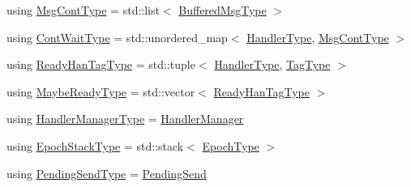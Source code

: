 \begin{DoxyCompactItemize}
using \hyperlink{structvt_1_1messaging_1_1_active_messenger_a18bbfbf9ecd82b33f6fc475b2e5290a5}{Msg\+Cont\+Type} = std\+::list$<$ \hyperlink{structvt_1_1messaging_1_1_active_messenger_a80a9cbda399d7bf035bfcecc761f4b02}{Buffered\+Msg\+Type} $>$
\item 
using \hyperlink{structvt_1_1messaging_1_1_active_messenger_a1c52f4ec0c93821191cb3e69dc7c8604}{Cont\+Wait\+Type} = std\+::unordered\+\_\+map$<$ \hyperlink{namespacevt_af64846b57dfcaf104da3ef6967917573}{Handler\+Type}, \hyperlink{structvt_1_1messaging_1_1_active_messenger_a18bbfbf9ecd82b33f6fc475b2e5290a5}{Msg\+Cont\+Type} $>$
\item 
using \hyperlink{structvt_1_1messaging_1_1_active_messenger_a98bb74aa4a561161dd7c7073dcd5f1d3}{Ready\+Han\+Tag\+Type} = std\+::tuple$<$ \hyperlink{namespacevt_af64846b57dfcaf104da3ef6967917573}{Handler\+Type}, \hyperlink{namespacevt_a84ab281dae04a52a4b243d6bf62d0e52}{Tag\+Type} $>$
\item 
using \hyperlink{structvt_1_1messaging_1_1_active_messenger_a745d5e8cad8c2f67d20479afacc6e134}{Maybe\+Ready\+Type} = std\+::vector$<$ \hyperlink{structvt_1_1messaging_1_1_active_messenger_a98bb74aa4a561161dd7c7073dcd5f1d3}{Ready\+Han\+Tag\+Type} $>$
\item 
using \hyperlink{structvt_1_1messaging_1_1_active_messenger_ac7e9165df6550ea333f8eb018a5a0e60}{Handler\+Manager\+Type} = \hyperlink{structvt_1_1_handler_manager}{Handler\+Manager}
\item 
using \hyperlink{structvt_1_1messaging_1_1_active_messenger_a746358029c37dabf2b4c8ad26642aee9}{Epoch\+Stack\+Type} = std\+::stack$<$ \hyperlink{namespacevt_a81d11b28122d43bf9834577e4a06440f}{Epoch\+Type} $>$
\item 
using \hyperlink{structvt_1_1messaging_1_1_active_messenger_a3626a6ca76d8ad4ec7c3b47a2c70d3a8}{Pending\+Send\+Type} = \hyperlink{structvt_1_1messaging_1_1_pending_send}{Pending\+Send}
\end{DoxyCompactItemize}
